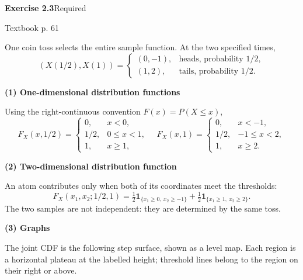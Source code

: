 \documentclass[a4paper,11pt]{article}
\newcommand{\problem}[3]{{\LARGE\bfseries Exercise #1}\hfill #2\par{\small\color{gray}Textbook p. #3}\par\vspace{3mm}}
\newcommand{\step}[1]{\par\textbf{#1}\par}
\begin{document}
\problem{2.3}{Required}{61}
One coin toss selects the entire sample function. At the two specified times,
\[
(X(1/2),X(1))=\begin{cases}(0,-1),&\text{heads, probability }1/2,\\(1,2),&\text{tails, probability }1/2.\end{cases}
\]
\step{(1) One-dimensional distribution functions}
Using the right-continuous convention $F(x)=P(X\le x)$,
\[
\boxed{F_X(x,1/2)=\begin{cases}0,&x<0,\\1/2,&0\le x<1,\\1,&x\ge1,\end{cases}}
\quad
\boxed{F_X(x,1)=\begin{cases}0,&x<-1,\\1/2,&-1\le x<2,\\1,&x\ge2.\end{cases}}
\]
\step{(2) Two-dimensional distribution function}
An atom contributes only when both of its coordinates meet the thresholds:
\[
\boxed{F_X(x_1,x_2;1/2,1)=\tfrac12\mathbf1_{\{x_1\ge0,\ x_2\ge-1\}}
+\tfrac12\mathbf1_{\{x_1\ge1,\ x_2\ge2\}}.}
\]
The two samples are not independent: they are determined by the same toss.
\step{(3) Graphs}
\begin{center}
\hspace{13mm}
\end{center}
The joint CDF is the following step surface, shown as a level map. Each region is a horizontal plateau at the labelled height; threshold lines belong to the region on their right or above.
\end{document}
